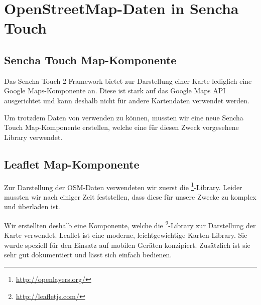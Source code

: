 \chapter{OpenStreetMap-Daten in Sencha Touch}
\label{leaflet-sencha-komponente}

\section{Sencha Touch Map-Komponente}

Das Sencha Touch 2-Framework bietet zur Darstellung einer Karte lediglich eine Google Maps-Komponente an.
Diese ist stark auf das Google Maps API ausgerichtet und kann deshalb nicht für andere Kartendaten verwendet werden.

Um trotzdem Daten von  verwenden zu können, mussten wir eine neue Sencha Touch Map-Komponente erstellen, welche eine für diesen Zweck vorgesehene Library verwendet.

\section{Leaflet Map-Komponente}

Zur Darstellung der OSM-Daten verwendeten wir zuerst die \footnote{\url{http://openlayers.org/}}-Library.
Leider mussten wir nach einiger Zeit feststellen, dass diese für unsere Zwecke zu komplex und überladen ist.

Wir erstellten deshalb eine Komponente, welche die \footnote{\url{http://leafletjs.com/}}-Library zur Darstellung der Karte verwendet.
Leaflet ist eine moderne, leichtgewichtige Karten-Library.
Sie wurde speziell für den Einsatz auf mobilen Geräten konzipiert.
Zusätzlich ist sie sehr gut dokumentiert und lässt sich einfach bedienen.

